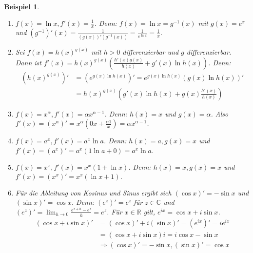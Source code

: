 \documentclass[ngerman,titlepage,twoside, parskip=half*]{scrreprt}
\newcommand*{\R}{\mathbb{R}}
\newcommand*{\C}{\mathbb{C}}
\theoremstyle{break}
\theoremstyle{nonumberbreak}
\newtheorem{beispiel}{Beispiel}
\begin{document}
\begin{beispiel}
  \begin{enumerate}[(1)]
  \item $f(x)=\ln x, f'(x)=\frac{1}{x}$. Denn: $f(x)=\ln x=g^{-1}(x)$ mit
    $g(x) =e^x$ und $(g^{-1})'(x)= \frac{1}{(g(x))'(g^{-1}(x))}=
    \frac{1}{e^{\ln x}}=\frac{1}{x}$.
   \item Sei $f(x)=h(x)^{g(x)}$ mit $h>0$ differenzierbar und $g$ differenzierbar.
    Dann ist $f'(x)=h(x)^{g(x)}(\frac{h'(x)g(x)}{h(x)}+g'(x)\ln h(x))$. Denn:
    \begin{align*}
      (h(x)^{g(x)})' &=(e^{g(x)\ln h(x)})'=e^{g(x)\ln h(x)} (g(x)\ln h(x))'\\
      &=h(x)^{g(x)}(g'(x)\ln h(x)+g(x)\frac{h'(x)}{h(x)})
    \end{align*}
  
  \item $f(x) = x^\alpha, f'(x) = \alpha x^{\alpha-1}$. Denn: $h(x)=x$ und
    $g(x)=\alpha$. Also $f'(x)=(x^\alpha)'=x^\alpha
    (0x+\frac{\alpha 1}{x})=\alpha x^{\alpha-1}$.
  \item $f(x) = a^x, f'(x) = a^x \ln a$. Denn: $h(x)=a, g(x)=x$ und
    $f'(x)=(a^x)' =a^x(1\ln a+0)=a^x\ln a$.
  \item $f(x) = x^x, f'(x) = x^x(1+\ln x)$. Denn: $h(x)=x, g(x)=x$ und
    $f'(x)=(x^x)'=x^x(\ln x+1)$.
  \item Für die Ableitung von Kosinus und Sinus ergibt sich $(\cos x)'=-\sin
    x$ und $(\sin x)'=\cos x$. Denn: $(e^z)'=e^z$ für $z\in\C$
    und $(e^z)'=\lim_{h\rightarrow 0} \frac{e^{z+h}-e^z}{h}=e^z$. Für $x\in\R$
    gilt, $e^{ix}=\cos x+i\sin x$.
    \begin{align*}
      (\cos x+i\sin x)' &= (\cos x)'+i(\sin x)'=(e^{ix})'=ie^{ix}\\
     &= (\cos x+i\sin x)i=i\cos x-\sin x\\
      &\Rightarrow (\cos x)'=-\sin x, (\sin x)'=\cos x
    \end{align*}
\end{enumerate}
\end{beispiel}
\end{document}
